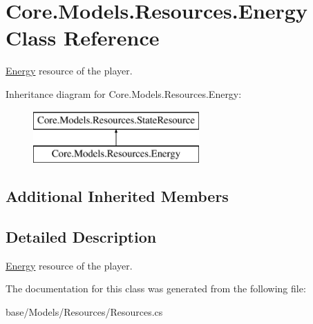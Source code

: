 \hypertarget{classCore_1_1Models_1_1Resources_1_1Energy}{}\section{Core.\+Models.\+Resources.\+Energy Class Reference}
\label{classCore_1_1Models_1_1Resources_1_1Energy}


\hyperlink{classCore_1_1Models_1_1Resources_1_1Energy}{Energy} resource of the player.  


Inheritance diagram for Core.\+Models.\+Resources.\+Energy\+:\begin{figure}[H]
\begin{center}
\leavevmode
\includegraphics[height=2.000000cm]{classCore_1_1Models_1_1Resources_1_1Energy}
\end{center}
\end{figure}
\subsection*{Additional Inherited Members}


\subsection{Detailed Description}
\hyperlink{classCore_1_1Models_1_1Resources_1_1Energy}{Energy} resource of the player. 



The documentation for this class was generated from the following file\+:\begin{DoxyCompactItemize}
\item 
base/\+Models/\+Resources/Resources.\+cs\end{DoxyCompactItemize}
